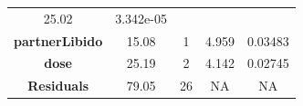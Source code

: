 \documentclass[]{article}
\begin{document}
\begin{longtable}[]{@{}ccccc@{}}
\begin{minipage}[t]{0.12\columnwidth}
25.02\strut
\end{minipage} & \begin{minipage}[t]{0.13\columnwidth}\centering\strut
3.342e-05\strut
\end{minipage}\tabularnewline
\begin{minipage}[t]{0.24\columnwidth}\centering\strut
\textbf{partnerLibido}\strut
\end{minipage} & \begin{minipage}[t]{0.11\columnwidth}\centering\strut
15.08\strut
\end{minipage} & \begin{minipage}[t]{0.06\columnwidth}\centering\strut
1\strut
\end{minipage} & \begin{minipage}[t]{0.12\columnwidth}\centering\strut
4.959\strut
\end{minipage} & \begin{minipage}[t]{0.13\columnwidth}\centering\strut
0.03483\strut
\end{minipage}\tabularnewline
\begin{minipage}[t]{0.24\columnwidth}\centering\strut
\textbf{dose}\strut
\end{minipage} & \begin{minipage}[t]{0.11\columnwidth}\centering\strut
25.19\strut
\end{minipage} & \begin{minipage}[t]{0.06\columnwidth}\centering\strut
2\strut
\end{minipage} & \begin{minipage}[t]{0.12\columnwidth}\centering\strut
4.142\strut
\end{minipage} & \begin{minipage}[t]{0.13\columnwidth}\centering\strut
0.02745\strut
\end{minipage}\tabularnewline
\begin{minipage}[t]{0.24\columnwidth}\centering\strut
\textbf{Residuals}\strut
\end{minipage} & \begin{minipage}[t]{0.11\columnwidth}\centering\strut
79.05\strut
\end{minipage} & \begin{minipage}[t]{0.06\columnwidth}\centering\strut
26\strut
\end{minipage} & \begin{minipage}[t]{0.12\columnwidth}\centering\strut
NA\strut
\end{minipage} & \begin{minipage}[t]{0.13\columnwidth}\centering\strut
NA\strut
\end{minipage}\tabularnewline
\bottomrule
\end{longtable}
\end{document}
